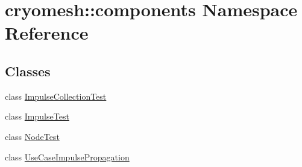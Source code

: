 \hypertarget{namespacecryomesh_1_1components}{
\section{cryomesh::components Namespace Reference}
\label{namespacecryomesh_1_1components}
}
\subsection*{Classes}
\begin{DoxyCompactItemize}
\item 
class \hyperlink{classcryomesh_1_1components_1_1_impulse_collection_test}{ImpulseCollectionTest}
\item 
class \hyperlink{classcryomesh_1_1components_1_1_impulse_test}{ImpulseTest}
\item 
class \hyperlink{classcryomesh_1_1components_1_1_node_test}{NodeTest}
\item 
class \hyperlink{classcryomesh_1_1components_1_1_use_case_impulse_propagation}{UseCaseImpulsePropagation}
\end{DoxyCompactItemize}

